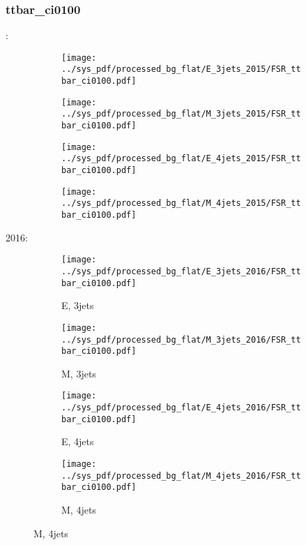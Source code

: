 \documentclass{beamer}
\begin{document}
\begin{frame}
\frametitle{ttbar_ci0100}
\fontsize{5}{1}:
\begin{figure}
\centering
\begin{subfigure}[b]{0.24\textwidth}
\texttt{[image: ../sys\_pdf/processed\_bg\_flat/E\_3jets\_2015/FSR\_ttbar\_ci0100.pdf]}
\end{subfigure}
\begin{subfigure}[b]{0.24\textwidth}
\texttt{[image: ../sys\_pdf/processed\_bg\_flat/M\_3jets\_2015/FSR\_ttbar\_ci0100.pdf]}
\end{subfigure}
\begin{subfigure}[b]{0.24\textwidth}
\texttt{[image: ../sys\_pdf/processed\_bg\_flat/E\_4jets\_2015/FSR\_ttbar\_ci0100.pdf]}
\end{subfigure}
\begin{subfigure}[b]{0.24\textwidth}
\texttt{[image: ../sys\_pdf/processed\_bg\_flat/M\_4jets\_2015/FSR\_ttbar\_ci0100.pdf]}
\end{subfigure}
\end{figure}
2016:
\begin{figure}
\centering
\begin{subfigure}[b]{0.24\textwidth}
\texttt{[image: ../sys\_pdf/processed\_bg\_flat/E\_3jets\_2016/FSR\_ttbar\_ci0100.pdf]}
\captionsetup{font=tiny}
\caption{E, 3jets}
\end{subfigure}
\begin{subfigure}[b]{0.24\textwidth}
\texttt{[image: ../sys\_pdf/processed\_bg\_flat/M\_3jets\_2016/FSR\_ttbar\_ci0100.pdf]}
\captionsetup{font=tiny}
\caption{M, 3jets}
\end{subfigure}
\begin{subfigure}[b]{0.24\textwidth}
\texttt{[image: ../sys\_pdf/processed\_bg\_flat/E\_4jets\_2016/FSR\_ttbar\_ci0100.pdf]}
\captionsetup{font=tiny}
\caption{E, 4jets}
\end{subfigure}
\begin{subfigure}[b]{0.24\textwidth}
\texttt{[image: ../sys\_pdf/processed\_bg\_flat/M\_4jets\_2016/FSR\_ttbar\_ci0100.pdf]}
\captionsetup{font=tiny}
\caption{M, 4jets}
\end{subfigure}
\end{figure}
\end{frame}
\end{document}
